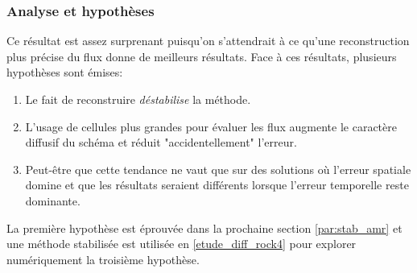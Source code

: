 \subsubsection{Analyse et hypothèses}
Ce résultat est assez surprenant puisqu'on s'attendrait à ce qu'une reconstruction plus précise du flux donne de meilleurs résultats.
Face à ces résultats, plusieurs hypothèses sont émises:
\begin{enumerate}
    \item Le fait de reconstruire \textit{déstabilise} la méthode.
    \item L'usage de cellules plus grandes pour évaluer les flux augmente le caractère diffusif du schéma et réduit "accidentellement" l'erreur.
    \item Peut-être que cette tendance ne vaut que sur des solutions où l'erreur spatiale domine et que les résultats seraient différents lorsque l'erreur temporelle reste dominante.
\end{enumerate}
La première hypothèse est éprouvée dans la prochaine section \ref{par:stab_amr} et une méthode stabilisée est utilisée en \ref{etude_diff_rock4} pour explorer numériquement la troisième hypothèse.